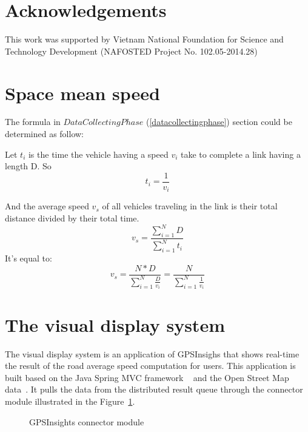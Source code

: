 \documentclass{sig-alternate-05-2015}
\begin{document}
\section{Acknowledgements}
This work was supported by Vietnam National Foundation for Science and Technology Development (NAFOSTED Project No. 102.05-2014.28)
%

%
%
\appendix \label{appendix}

\section{Space mean speed}
The formula in $Data Collecting Phase$ (\ref{datacollectingphase}) section could be determined as follow:

Let $t_{i}$ is the time the vehicle having a speed $v_{i}$ take to complete a link having a length D. So
	\[ t_{i} = \frac{1}{v_{i}} \] 

And the average speed $v_{s}$ of all vehicles traveling in the link is their total distance divided by their total time.
	\[v_{s} = \frac{\sum_{i=1}^{N} D}{\sum_{i=1}^{N} t_{i}}\]
It's equal to:
	\[v_{s} = \frac{N \ast D}{\sum_{i=1}^{N} \frac{D}{v_{i}}} = \frac{N}{\sum_{i=1}^{N}\frac{1}{v_{i}}} \]

\section{The visual display system}

The visual display system is an application of GPSInsighs that shows real-time the result of the road average speed computation for users. This application is built based on the Java Spring MVC framework ~\cite{javaspringmvc} and the Open Street Map data~\cite{openstreetmap}. It pulls the data from the distributed result queue through the connector module illustrated in the Figure~\ref{fig:connectmodule}.

\begin{figure}[h]
	\centering
	\caption{GPSInsights connector module}
	\label{fig:connectmodule}
\end{figure}
\end{document}

